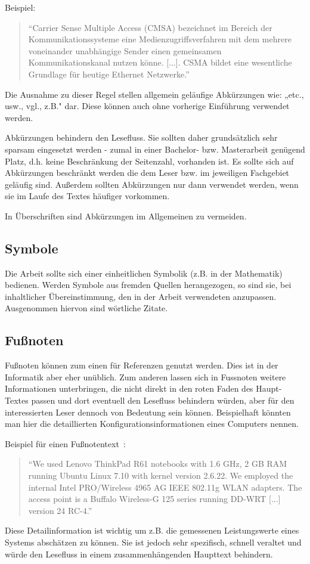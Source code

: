 Beispiel:
%
\begin{quote}
  \enquote{Carrier Sense Multiple Access (CMSA) bezeichnet im Bereich der Kommunikationssysteme eine Medienzugriffsverfahren mit dem mehrere voneinander unabhängige Sender einen gemeinsamen Kommunikationskanal nutzen könne. [...]. CSMA bildet eine wesentliche Grundlage für heutige Ethernet Netzwerke.}~\cite{wikipedia:csma}
\end{quote}
\smallskip

Die Ausnahme zu dieser Regel stellen allgemein geläufige Abkürzungen wie: „etc., usw., vgl., z.B." dar. Diese können auch ohne vorherige Einführung verwendet werden.

Abkürzungen behindern den Lesefluss. Sie sollten daher grundsätzlich sehr sparsam eingesetzt werden - zumal in einer Bachelor- bzw. Masterarbeit genügend Platz, d.h. keine Beschränkung der Seitenzahl, vorhanden ist. Es sollte sich auf Abkürzungen beschränkt werden die dem Leser bzw. im jeweiligen Fachgebiet geläufig sind. Außerdem sollten Abkürzungen nur dann verwendet werden, wenn sie im Laufe des Textes häufiger vorkommen.

In Überschriften sind Abkürzungen im Allgemeinen zu vermeiden.

\subsection{Symbole}\label{sec:language:symbols}
%
Die Arbeit sollte sich einer einheitlichen Symbolik (z.B. in der Mathematik) bedienen. Werden Symbole aus fremden Quellen herangezogen, so sind sie, bei inhaltlicher Übereinstimmung, den in der Arbeit verwendeten anzupassen. Ausgenommen hiervon sind wörtliche Zitate.


\subsection{Fußnoten}\label{sec:language:footnotes}
%
Fußnoten können zum einen für Referenzen genutzt werden. Dies ist in der Informatik aber eher unüblich. Zum anderen lassen sich in Fussnoten weitere Informationen unterbringen, die nicht direkt in den roten Faden des Haupt-Textes passen und dort eventuell den Lesefluss behindern würden, aber für den interessierten Leser dennoch von Bedeutung sein können. Beispielhaft könnten man hier die detaillierten Konfigurationsinformationen eines Computers nennen.

Beispiel für einen Fußnotentext~\cite{bredel:2009:01}:
%
\begin{quote}
  \enquote{We used Lenovo ThinkPad R61 notebooks with 1.6 GHz, 2 GB RAM running Ubuntu Linux 7.10 with kernel version 2.6.22. We employed the internal Intel PRO/Wireless 4965 AG IEEE 802.11g WLAN adapters. The access point is a Buffalo Wireless-G 125 series running DD-WRT [...] version 24 RC-4.}
\end{quote}

Diese Detailinformation ist wichtig um z.B. die gemessenen Leistungswerte eines Systems abschätzen zu können. Sie ist jedoch sehr spezifisch, schnell veraltet und würde den Lesefluss in einem zusammenhängenden Haupttext behindern.

